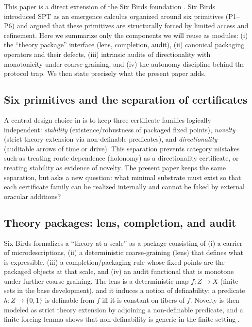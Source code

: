 \documentclass[11pt]{article}
\theoremstyle{definition}
\theoremstyle{remark}
\begin{document}
This paper is a direct extension of the Six Birds foundation \citep{sixbirds2026}.
Six Birds introduced SPT as an emergence calculus organized around six primitives (P1--P6) and argued that these primitives are structurally forced by limited access and refinement.
Here we summarize only the components we will reuse as modules: (i) the ``theory package'' interface (lens, completion, audit), (ii) canonical packaging operators and their defects, (iii) intrinsic audits of directionality with monotonicity under coarse-graining, and (iv) the autonomy discipline behind the protocol trap.
We then state precisely what the present paper adds.

\subsection{Six primitives and the separation of certificates}

A central design choice in \citet{sixbirds2026} is to keep three certificate families logically independent:
\emph{stability} (existence/robustness of packaged fixed points), \emph{novelty} (strict theory extension via non-definable predicates), and \emph{directionality} (auditable arrows of time or drive).
This separation prevents category mistakes such as treating route dependence (holonomy) as a directionality certificate, or treating stability as evidence of novelty.
The present paper keeps the same separation, but asks a new question: what minimal substrate must exist so that each certificate family can be realized internally and cannot be faked by external oracular additions?

\subsection{Theory packages: lens, completion, and audit}

Six Birds formalizes a ``theory at a scale'' as a package consisting of (i) a carrier of microdescriptions, (ii) a deterministic coarse-graining (lens) that defines what is expressible, (iii) a completion/packaging rule whose fixed points are the packaged objects at that scale, and (iv) an audit functional that is monotone under further coarse-graining.
The lens is a deterministic map $f:Z\to X$ (finite sets in the base development), and it induces a notion of definability: a predicate $h:Z\to\{0,1\}$ is definable from $f$ iff it is constant on fibers of $f$.
Novelty is then modeled as strict theory extension by adjoining a non-definable predicate, and a finite forcing lemma shows that non-definability is generic in the finite setting \citep{sixbirds2026}.
\end{document}

